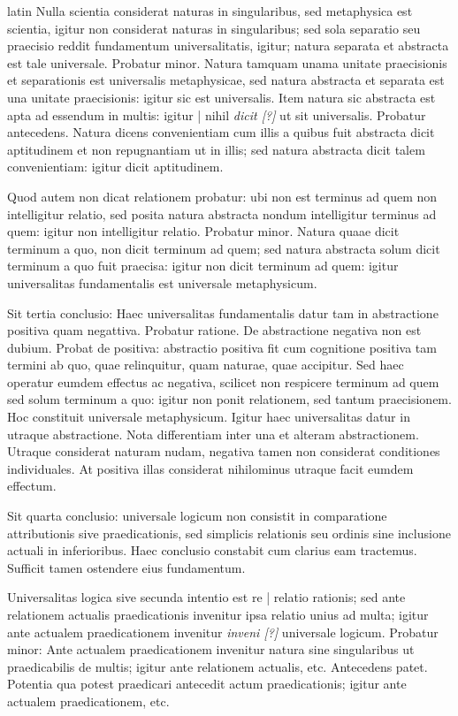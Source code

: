 \begin{otherlanguage*}{latin}
\pstart
Nulla scientia considerat naturas in singularibus, sed metaphysica est scientia, igitur non considerat naturas in singularibus; sed sola separatio seu praecisio reddit fundamentum universalitatis, igitur; natura separata et abstracta est tale universale. Probatur minor. Natura tamquam unama unitate praecisionis et separationis est universalis metaphysicae, sed natura abstracta et separata est una unitate praecisionis:
igitur sic est universalis. Item natura sic abstracta est apta ad essendum in multis:
igitur \textnormal{|} nihil \emph{dicit [?]} ut sit universalis. Probatur antecedens. Natura dicens convenientiam cum illis a quibus fuit abstracta dicit aptitudinem et non repugnantiam ut in illis; sed natura abstracta dicit talem convenientiam:
igitur dicit aptitudinem. 
\pend

\pstart
Quod autem non dicat relationem probatur:
ubi non est terminus ad quem non intelligitur relatio, sed posita natura abstracta nondum intelligitur terminus ad quem:
igitur non intelligitur relatio. Probatur minor. Natura quaae dicit terminum a quo, non dicit terminum ad quem; sed natura abstracta solum dicit terminum a quo fuit praecisa:
igitur non dicit terminum ad quem:
igitur universalitas fundamentalis est universale metaphysicum. 
\pend

\pstart
Sit tertia conclusio:
Haec universalitas fundamentalis datur tam in abstractione positiva quam negattiva. Probatur ratione. De abstractione negativa non est dubium. Probat de positiva:
abstractio positiva fit cum cognitione positiva tam termini ab quo, quae relinquitur, quam naturae, quae accipitur. Sed haec operatur eumdem effectus ac negativa, scilicet non respicere terminum ad quem sed solum terminum a quo:
igitur non ponit relationem, sed tantum praecisionem. Hoc constituit universale metaphysicum. Igitur haec universalitas datur in utraque abstractione. Nota differentiam inter una et alteram abstractionem. Utraque considerat naturam nudam, negativa tamen non considerat conditiones individuales. At positiva illas considerat nihilominus utraque facit eumdem effectum. 
\pend

\pstart
Sit quarta conclusio:
universale logicum non consistit in comparatione attributionis sive praedicationis, sed simplicis relationis seu ordinis sine inclusione actuali in inferioribus. Haec conclusio constabit cum clarius eam tractemus. Sufficit tamen ostendere eius fundamentum. 
\pend

\pstart
Universalitas logica sive secunda intentio est re \textnormal{|} relatio rationis; sed ante relationem actualis praedicationis invenitur ipsa relatio unius ad multa; igitur ante actualem praedicationem invenitur \emph{inveni [?]} universale logicum. Probatur minor:
Ante actualem praedicationem invenitur natura sine singularibus ut praedicabilis de multis; igitur ante relationem actualis, etc. Antecedens patet. Potentia qua potest praedicari antecedit actum praedicationis; igitur ante actualem praedicationem, etc. 
\pend


\end{otherlanguage*}

